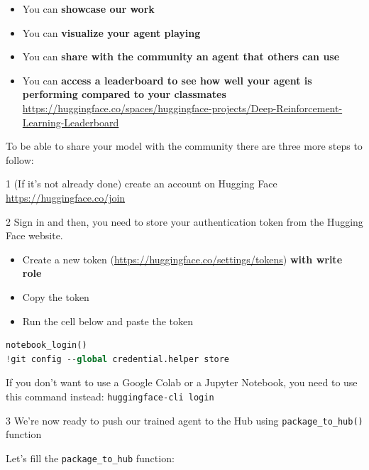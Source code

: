 \documentclass[11pt,a4paper]{article}
\begin{document}
\begin{itemize}
\tightlist
\item
  You can \textbf{showcase our work}
\item
  You can \textbf{visualize your agent playing}
\item
  You can \textbf{share with the community an agent that others can use}
\item
  You can \textbf{access a leaderboard to see how well your agent is performing compared to your classmates} \url{https://huggingface.co/spaces/huggingface-projects/Deep-Reinforcement-Learning-Leaderboard}
\end{itemize}

To be able to share your model with the community there are three more steps to follow:

1 (If it's not already done) create an account on Hugging Face \url{https://huggingface.co/join}

2 Sign in and then, you need to store your authentication token from the Hugging Face website.

\begin{itemize}
\tightlist
\item
  Create a new token (\url{https://huggingface.co/settings/tokens}) \textbf{with write role}
\end{itemize}


\begin{itemize}
\tightlist
\item
  Copy the token
\item
  Run the cell below and paste the token
\end{itemize}

\begin{lstlisting}[language=Python]
notebook_login()
!git config --global credential.helper store
\end{lstlisting}

If you don't want to use a Google Colab or a Jupyter Notebook, you need to use this command instead: \passthrough{\lstinline!huggingface-cli login!}

3 We're now ready to push our trained agent to the Hub using \passthrough{\lstinline!package_to_hub()!} function

Let's fill the \passthrough{\lstinline!package_to_hub!} function:
\end{document}
